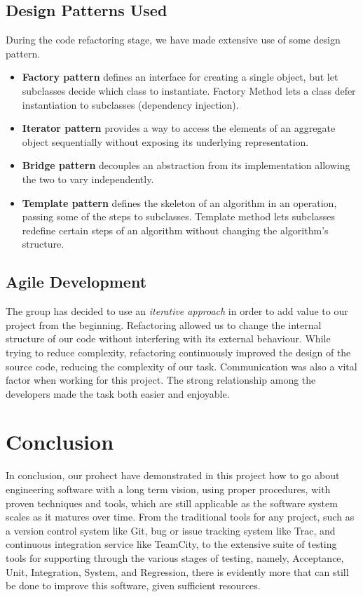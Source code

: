 \documentclass[11pt,twocolumn]{article} %
\begin{document}
\subsection{Design Patterns Used}
During the code refactoring stage, we have made extensive use of some design pattern.
\begin{itemize}
\item{{\bf Factory pattern} defines an interface for creating a single object, but let subclasses decide which class to instantiate. Factory Method lets a class defer instantiation to subclasses (dependency injection).}
\item{{\bf Iterator pattern} provides a way to access the elements of an aggregate object sequentially without exposing its underlying representation.}
\item{{\bf Bridge pattern} decouples an abstraction from its implementation allowing the two to vary independently.}
\item{{\bf Template pattern} defines the skeleton of an algorithm in an operation, passing some of the steps to subclasses.
Template method lets subclasses redefine certain steps of an algorithm without changing the algorithm's structure.}
\end{itemize}


\subsection{Agile Development}
The group has decided to use an \emph{iterative approach} in order to add value to our project from the beginning. 
Refactoring allowed us to change the internal structure of our code without interfering with its external behaviour. While trying to reduce complexity, refactoring continuously improved the design of the source code, reducing the complexity of our task.
Communication was also a vital factor when working for this project. The strong relationship among the developers made the task both 
easier and enjoyable.

\section{Conclusion}
In conclusion, our prohect have demonstrated in this project how to go about engineering software
with a long term vision, using proper procedures, with proven techniques and tools, which
are still applicable as the software system scales as it matures over time.
From the traditional tools for any project, such as a version control system like Git, bug
or issue tracking system like Trac, and continuous integration service like TeamCity, to
the extensive suite of testing tools for supporting through the various stages of testing,
namely, Acceptance, Unit, Integration, System, and Regression, there is evidently more
that can still be done to improve this software, given sufficient resources.
\end{document}

